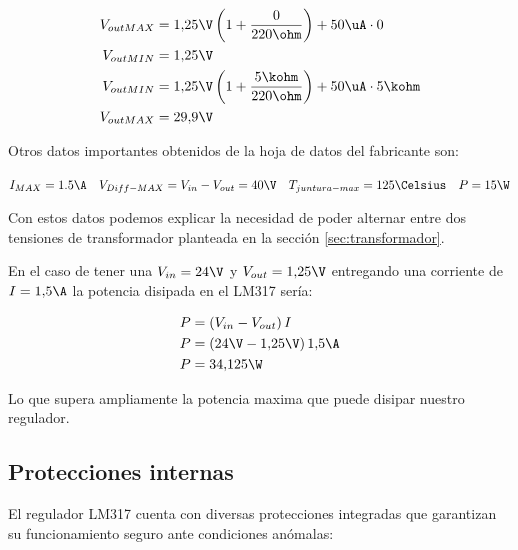 \begin{equation}
  \begin{aligned}
    V_{out MAX} &= 1{,}25\V \left(1 + \frac{0}{220\ohm} \right) + 50\uA \cdot 0 \\
    V_{out MIN} &= 1{,}25 \V \\
    V_{out MIN} &= 1{,}25\V \left(1 + \frac{5\kohm}{220\ohm} \right) + 50\uA \cdot 5\kohm \\
    V_{out MAX} &= 29{,}9 \V \\
  \end{aligned}
\end{equation}

Otros datos importantes obtenidos de la hoja de datos del fabricante son:

\begin{center}
  $I_{MAX}=1.5\A \quad V_{Diff-MAX}=V_{in}-V_{out}=40\V \quad T_{juntura-max}=125\Celsius \quad P=15\W$ 
\end{center}

Con estos datos podemos explicar la necesidad de poder alternar entre dos tensiones de transformador planteada
en la sección \ref{sec:transformador}.

En el caso de tener una $V_{in}=24\V$ y $V_{out}=1{,}25\V$ entregando una corriente de $I=1{,}5\A$ la potencia disipada
en el LM317 sería:

\begin{equation}
  \begin{aligned}
    P &= \left( V_{in} - V_{out}\right) I \\
    P &= \left( 24\V - 1{,}25\V\right) 1{,}5 \A \\
    P &= 34{,}125 \W
  \end{aligned}
\end{equation}

Lo que supera ampliamente la potencia maxima que puede disipar nuestro regulador.


\subsection{Protecciones internas}
  El regulador LM317 cuenta con diversas protecciones integradas que garantizan su funcionamiento seguro ante
  condiciones anómalas:

